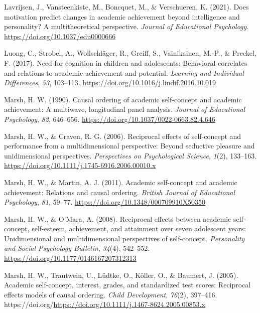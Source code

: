 \documentclass[
  man]{apa6}
\newlength{\cslhangindent}
\newlength{\cslentryspacingunit} %
\newenvironment{CSLReferences}[2] %
 {%
  \setlength{\parindent}{0pt}
  \ifodd #1
  \let\oldpar\par
  \def\par{\hangindent=\cslhangindent\oldpar}
  \fi
  \setlength{\parskip}{#2\cslentryspacingunit}
 }%
 {}
\begin{document}
\begin{CSLReferences}{1}{0}
\leavevmode{}%
Lavrijsen, J., Vansteenkiste, M., Boncquet, M., \& Verschueren, K. (2021). Does motivation predict changes in academic achievement beyond intelligence and personality? A multitheoretical perspective. \emph{Journal of Educational Psychology}. \url{https://doi.org/10.1037/edu0000666}

\leavevmode{}%
Luong, C., Strobel, A., Wollschläger, R., Greiff, S., Vainikainen, M.-P., \& Preckel, F. (2017). Need for cognition in children and adolescents: Behavioral correlates and relations to academic achievement and potential. \emph{Learning and Individual Differences}, \emph{53}, 103--113. \url{https://doi.org/10.1016/j.lindif.2016.10.019}

\leavevmode{}%
Marsh, H. W. (1990). Causal ordering of academic self-concept and academic achievement: A multiwave, longitudinal panel analysis. \emph{Journal of Educational Psychology}, \emph{82}, 646--656. \url{https://doi.org/10.1037/0022-0663.82.4.646}

\leavevmode{}%
Marsh, H. W., \& Craven, R. G. (2006). Reciprocal effects of self-concept and performance from a multidimensional perspective: Beyond seductive pleasure and unidimensional perspectives. \emph{Perspectives on Psychological Science}, \emph{1}(2), 133--163. \url{https://doi.org/10.1111/j.1745-6916.2006.00010.x}

\leavevmode{}%
Marsh, H. W., \& Martin, A. J. (2011). Academic self-concept and academic achievement: Relations and causal ordering. \emph{British Journal of Educational Psychology}, \emph{81}, 59--77. \url{https://doi.org/10.1348/000709910X50350}

\leavevmode{}%
Marsh, H. W., \& O'Mara, A. (2008). Reciprocal effects between academic self-concept, self-esteem, achievement, and attainment over seven adolescent years: Unidimensional and multidimensional perspectives of self-concept. \emph{Personality and Social Psychology Bulletin}, \emph{34}(4), 542--552. \url{https://doi.org/10.1177/0146167207312313}

\leavevmode{}%
Marsh, H. W., Trautwein, U., Lüdtke, O., Köller, O., \& Baumert, J. (2005). Academic self-concept, interest, grades, and standardized test scores: Reciprocal effects models of causal ordering. \emph{Child Development}, \emph{76}(2), 397--416. https://doi.org/\url{https://doi.org/10.1111/j.1467-8624.2005.00853.x}


\end{CSLReferences}
\end{document}
